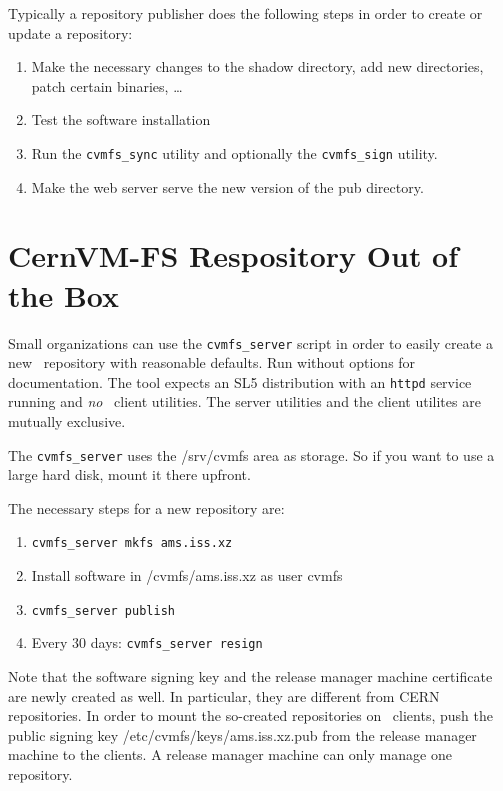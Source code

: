Typically a repository publisher does the following steps in order to create or update a repository:
\begin{enumerate}
	\item Make the necessary changes to the shadow directory, \ie add new directories, patch certain binaries, \dots
	\item Test the software installation
	\item Run the \texttt{cvmfs\_sync} utility and optionally the \texttt{cvmfs\_sign} utility.
	\item Make the web server serve the new version of the pub directory.
\end{enumerate}

\section{CernVM-FS Respository Out of the Box}
Small organizations can use the \texttt{cvmfs\_server} script in order to easily create a new \cvmfs\ repository with reasonable defaults.
Run without options for documentation.
The tool expects an SL5 distribution with an \texttt{httpd} service running and \emph{no} \cvmfs\ client utilities.
The server utilities and the client utilites are mutually exclusive.

The \texttt{cvmfs\_server} uses the /srv/cvmfs area as storage. 
So if you want to use a large hard disk, mount it there upfront.

The necessary steps for a new repository are:
\begin{enumerate}
	\item \texttt{cvmfs\_server mkfs ams.iss.xz}
	\item Install software in /cvmfs/ams.iss.xz as user cvmfs
	\item \texttt{cvmfs\_server publish}
	\item Every 30 days: \texttt{cvmfs\_server resign}
\end{enumerate}

Note that the software signing key and the release manager machine certificate are newly created as well.
In particular, they are different from CERN repositories.
In order to mount the so-created repositories on \cvmfs\ clients, push the public signing key /etc/cvmfs/keys/ams.iss.xz.pub from the release manager machine to the clients.
A release manager machine can only manage one repository.


